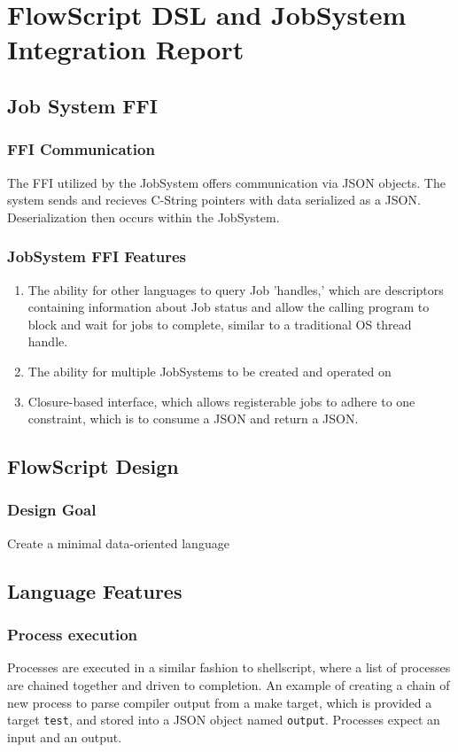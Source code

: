\documentclass{article}
\begin{document}
\section*{FlowScript DSL and JobSystem Integration Report}
	\subsection{Job System FFI}
		\subsubsection{FFI Communication}
			The FFI utilized by the JobSystem offers communication via JSON objects. The system sends and recieves C-String pointers with data serialized as a JSON. Deserialization then occurs within the JobSystem.
		\subsubsection{JobSystem FFI Features}
			\begin{enumerate}
				\item The ability for other languages to query Job 'handles,' which are descriptors containing information about Job status and allow the calling program to block and wait for jobs to complete, similar to a traditional OS thread handle.
				\item The ability for multiple JobSystems to be created and operated on
				\item Closure-based interface, which allows registerable jobs to adhere to one constraint, which is to consume a JSON and return a JSON.
			\end{enumerate}
	\subsection{FlowScript Design}
		\subsubsection{Design Goal}
			Create a minimal data-oriented language
		\subsection{Language Features}
			\subsubsection{Process execution}
				Processes are executed in a similar fashion to shellscript, where a list of processes are chained together and driven to completion. An example of creating a chain of new process to parse compiler output from a make target, which is provided a target \texttt{test}, and stored into a JSON object named \texttt{output}. Processes expect an input and an output. 
				
\end{document}
